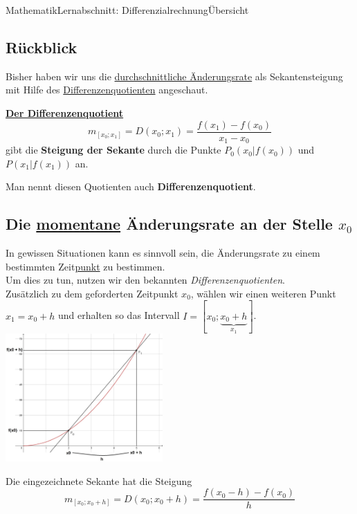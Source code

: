 \documentclass[11pt,twocolumn,oneside,openany,headings=optiontotoc,11pt,numbers=noenddot,final]{article}
\begin{document}
	\begin{worksheet}{Mathematik}{Lernabschnitt: Differenzialrechnung}{Übersicht}
		\setcounter{section}{7}
		\subsection*{Rückblick}
		Bisher haben wir uns die \underline{durchschnittliche Änderungsrate} als Sekantensteigung mit Hilfe des \underline{Differenzenquotienten} angeschaut.\\
		\begin{framed}
			\noindent
			\underline{\textbf{Der Differenzenquotient}}
			\[m_{[x_0;x_1]} = D(x_0;x_1) = \frac{f(x_1) - f(x_0)}{x_1 - x_0}\] gibt die \textbf{Steigung der Sekante} durch die Punkte \(P_0(x_0|f(x_0))\) und \(P(x_1|f(x_1))\) an.\\
			\par\noindent
			Man nennt diesen Quotienten auch \textbf{Differenzenquotient}.
		\end{framed}
		\subsection{Die \underline{momentane} Änderungsrate an der Stelle \(x_0\)}
		In gewissen Situationen kann es sinnvoll sein, die Änderungsrate zu einem bestimmten Zeit\underline{punkt} zu bestimmen.\\
		Um dies zu tun, nutzen wir den bekannten \textit{Differenzenquotienten}.\\
		Zusätzlich zu dem geforderten Zeitpunkt \(x_0\), wählen wir einen weiteren Punkt \(x_1 = x_0 + h\) und erhalten so das Intervall \(I = [x_0; \underbrace{x_0 + h}_{x_1}]\).\\
		\includegraphics[width=0.45\textwidth]{../99_Bilder/04_Skr_DiffQuo.jpg}\\
		\par\noindent
		Die eingezeichnete Sekante hat die Steigung
		\[m_{[x_0;x_0+h]} = D(x_0;x_0+h) = \frac{f(x_0-h) - f(x_0)}{h}\]
		

\end{worksheet}
\end{document}
